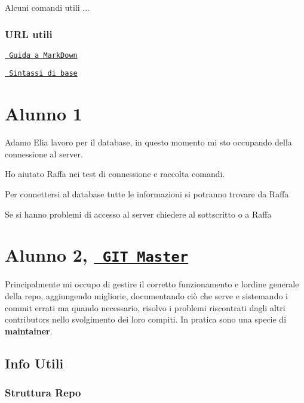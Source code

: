 Alcuni comandi utili ... 
\begin{DoxyCode}{0}
\end{DoxyCode}


\subsubsection*{U\+RL utili}


\begin{DoxyItemize}
\item \href{https://guides.github.com/features/mastering-markdown/}{\texttt{ Guida a Mark\+Down}}
\item \href{https://help.github.com/articles/basic-writing-and-formatting-syntax/}{\texttt{ Sintassi di base}}
\end{DoxyItemize}

\section*{Alunno 1}

Adamo Elia lavoro per il database, in questo momento mi sto occupando della connessione al server.

Ho aiutato Raffa nei test di connessione e raccolta comandi.

Per connettersi al database tutte le informazioni si potranno trovare da Raffa

Se si hanno problemi di accesso al server chiedere al sottscritto o a Raffa

\section*{Alunno 2, \href{\#git-master}{\texttt{ G\+IT Master}}}

Principalmente mi occupo di gestire il corretto funzionamento e l\textquotesingle{}ordine generale della repo, aggiungendo migliorie, documentando ciò che serve e sistemando i commit errati ma quando necessario, risolvo i problemi riscontrati dagli altri contributors nello svolgimento dei loro compiti. In pratica sono una specie di {\bfseries{maintainer}}. \subsection*{Info Utili}

\subsubsection*{Struttura Repo}

